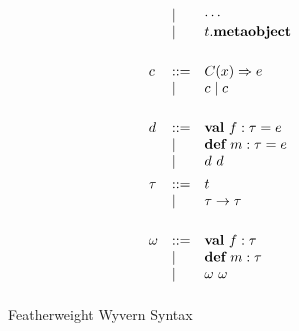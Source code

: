 \begin{figure}
\[\begin{array}{lll}
     & \mathrel{\mid} & \cdots \\
     & \mathrel{\mid} & t.\textbf{metaobject}\\
\\[1ex]
c    & ::= & C(x) \Rightarrow e\\
     & \mathrel{\mid} & c \mathrel{\mid} c\\
	 \\[1ex]
d    & ::= & \textbf{val}~ f:\tau = e \\
     & \mathrel{\mid} & \textbf{def}~ m:\tau = e \\
     & \mathrel{\mid} & d~d
\\[1ex]
\tau & ::= & t\\
     & \mathrel{\mid} & \tau \rightarrow \tau \\
\\[1ex]
\omega   & ::= & \textbf{val}~ f:\tau\\
         & \mathrel{\mid} & \textbf{def}~ m:\tau \\
         & \mathrel{\mid} & \omega~\omega 
\\[1ex]
\end{array}
\]
\caption{Featherweight Wyvern Syntax}
\label{fig:core2-syntax}
\end{figure}


